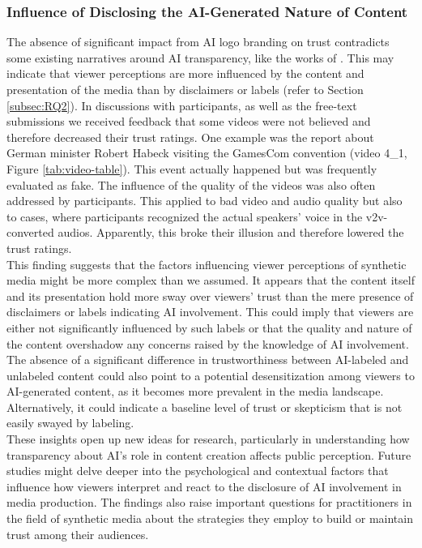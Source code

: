 \documentclass[
  a4paper,  %
  twoside,  %
  bibliography=totoc,
  headsepline,
  cleardoublepage=empty,
  parskip=half,
  draft=false
]{scrbook}
\begin{document}
\subsubsection{Influence of Disclosing the AI-Generated Nature of Content}
The absence of significant impact from AI logo branding on trust contradicts some existing narratives around AI transparency, like the works of . This may indicate that viewer perceptions are more influenced by the content and presentation of the media than by disclaimers or labels (refer to Section \ref{subsec:RQ2}). In discussions with participants, as well as the free-text submissions we received feedback that some videos were not believed and therefore decreased their trust ratings. One example was the report about German minister Robert Habeck visiting the GamesCom convention (video 4\_1, Figure \ref{tab:video-table}). This event actually happened but was frequently evaluated as fake. The influence of the quality of the videos was also often addressed by participants. This applied to bad video and audio quality but also to cases, where participants recognized the actual speakers' voice in the \gls{v2v}-converted audios. Apparently, this broke their illusion and therefore lowered the trust ratings. \\
This finding suggests that the factors influencing viewer perceptions of synthetic media might be more complex than we assumed. It appears that the content itself and its presentation hold more sway over viewers' trust than the mere presence of disclaimers or labels indicating AI involvement. This could imply that viewers are either not significantly influenced by such labels or that the quality and nature of the content overshadow any concerns raised by the knowledge of AI involvement. \\
The absence of a significant difference in trustworthiness between AI-labeled and unlabeled content could also point to a potential desensitization among viewers to AI-generated content, as it becomes more prevalent in the media landscape. Alternatively, it could indicate a baseline level of trust or skepticism that is not easily swayed by labeling. \\
These insights open up new ideas for research, particularly in understanding how transparency about AI's role in content creation affects public perception. Future studies might delve deeper into the psychological and contextual factors that influence how viewers interpret and react to the disclosure of AI involvement in media production. The findings also raise important questions for practitioners in the field of synthetic media about the strategies they employ to build or maintain trust among their audiences.
\end{document}
